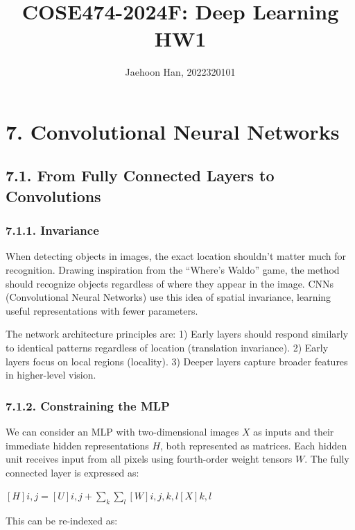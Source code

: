 \documentclass[11pt]{article}
\title{COSE474-2024F: Deep Learning HW1}
\author{Jaehoon Han, 2022320101}
\begin{document}
    
    \maketitle
    
    

    
    \section*{7. Convolutional Neural
Networks}\label{convolutional-neural-networks}

    \subsection*{7.1. From Fully Connected Layers to
Convolutions}\label{from-fully-connected-layers-to-convolutions}

    \subsubsection*{7.1.1. Invariance}\label{invariance}

    When detecting objects in images, the exact location shouldn't matter
much for recognition. Drawing inspiration from the ``Where's Waldo''
game, the method should recognize objects regardless of where they
appear in the image. CNNs (Convolutional Neural Networks) use this idea
of spatial invariance, learning useful representations with fewer
parameters.

    The network architecture principles are: 1) Early layers should respond
similarly to identical patterns regardless of location (translation
invariance). 2) Early layers focus on local regions (locality). 3)
Deeper layers capture broader features in higher-level vision.

    \subsubsection*{7.1.2. Constraining the MLP}\label{constraining-the-mlp}

    We can consider an MLP with two-dimensional images \(X\) as inputs and
their immediate hidden representations \(H\), both represented as
matrices. Each hidden unit receives input from all pixels using
fourth-order weight tensors \(W\). The fully connected layer is
expressed as:

\([H]{i,j} = [U]{i,j} + \sum_k \sum_l [W]{i,j,k,l} [X]{k,l}\)

This can be re-indexed as:
\end{document}

